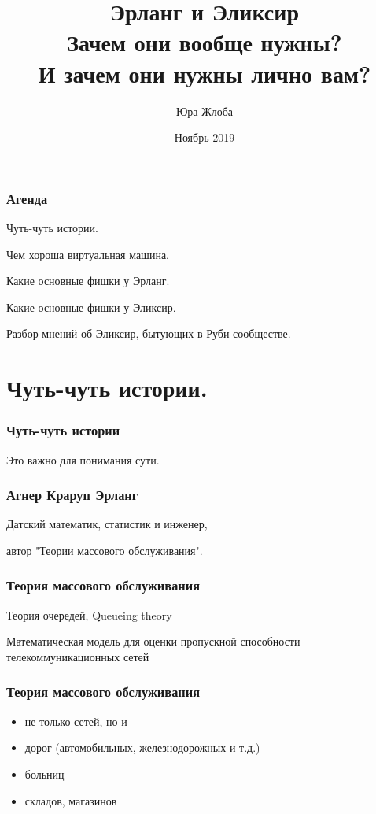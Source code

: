 \documentclass[10pt]{beamer}
\title{Эрланг и Эликсир \\
  \large Зачем они вообще нужны? \\
  И зачем они нужны лично вам?}
\author{Юра Жлоба}
\institute{Wargaming.net}
\date{Ноябрь 2019}
\begin{document}
\maketitle

\begin{frame}
\frametitle{Агенда}
\centering
Чуть-чуть истории.
\par \bigskip
Чем хороша виртуальная машина.
\par \bigskip
Какие основные фишки у Эрланг.
\par \bigskip
Какие основные фишки у Эликсир.
\par \bigskip
Разбор мнений об Эликсир, бытующих в Руби-сообществе.
\end{frame}


\section{Чуть-чуть истории.}

{
\begin{frame}
\frametitle{Чуть-чуть истории}
\centering
Это важно для понимания сути.
\end{frame}
}

\begin{frame}
\frametitle{Агнер Краруп Эрланг}
\centering
Датский математик, статистик и инженер,
\par \bigskip
автор "Теории массового обслуживания".
\end{frame}

\begin{frame}
\frametitle{Теория массового обслуживания}
\par \bigskip
Теория очередей, Queueing theory
\par \bigskip
Математическая модель для оценки пропускной способности телекоммуникационных сетей
\end{frame}

\begin{frame}
\frametitle{Теория массового обслуживания}
\begin{itemize}
\item не только сетей, но и
\item дорог (автомобильных, железнодорожных и т.д.)
\item больниц
\item складов, магазинов
\end{itemize}
\end{frame}
\end{document}
